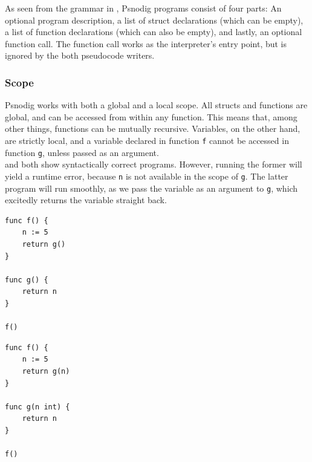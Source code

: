 As seen from the grammar in , Psnodig programs consist of four parts: An optional program description, a list of struct declarations (which can be empty), a list of function declarations (which can also be empty), and lastly, an optional function call. The function call works as the interpreter's entry point, but is ignored by the both pseudocode writers.

\subsubsection{Scope}

Psnodig works with both a global and a local scope. All structs and functions are global, and can be accessed from within any function. This means that, among other things, functions can be mutually recursive. Variables, on the other hand, are strictly local, and a variable declared in function \texttt{f} cannot be accessed in function \texttt{g}, unless passed as an argument. \\

 and  both show syntactically correct programs. However, running the former will yield a runtime error, because \texttt{n} is not available in the scope of \texttt{g}. The latter program will run smoothly, as we pass the variable as an argument to \texttt{g}, which excitedly returns the variable straight back. \\

\begin{minipage}{.45\textwidth}
\begin{lstlisting}[caption={Gourmet program which provokes a runtime error.}, captionpos=b, label={Gourmet program which provokes a runtime error.}]
func f() {
    n := 5
    return g()
}

func g() {
    return n
}

f()
\end{lstlisting}
\end{minipage}\hfill
\begin{minipage}{.45\textwidth}
\begin{lstlisting}[caption={Gourmet program that will run uninterrupted.}, captionpos=b, label={Gourmet code without error.}]
func f() {
    n := 5
    return g(n)
}

func g(n int) {
    return n
}

f()
\end{lstlisting}
\end{minipage}

